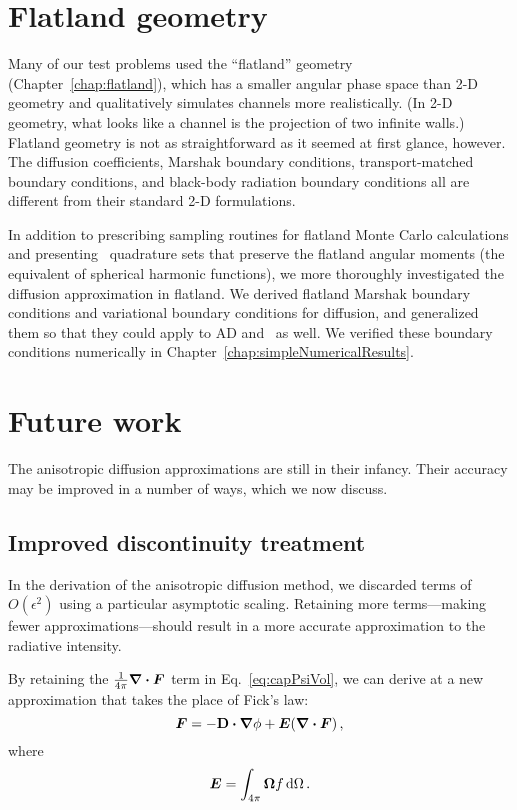 \section{Flatland geometry}

Many of our test problems used the ``flatland'' geometry
(Chapter~\ref{chap:flatland}), which has a smaller angular phase space than 2-D
geometry and qualitatively simulates channels more realistically. (In 2-D
geometry, what looks like a channel is the projection of two infinite walls.)
Flatland geometry is not as straightforward as it seemed at first glance,
however. The diffusion coefficients, Marshak boundary conditions,
transport-matched boundary conditions, and black-body radiation boundary
conditions all are different from their standard 2-D formulations.

In addition to prescribing sampling routines for flatland Monte Carlo
calculations and presenting \SN\ quadrature sets that preserve the flatland
angular moments (the equivalent of spherical harmonic functions), we more
thoroughly investigated the diffusion approximation in flatland. We derived
flatland Marshak boundary conditions and variational boundary conditions for
diffusion, and generalized them so that they could apply to AD and \APone\ as
well. We verified these boundary conditions numerically in
Chapter~\ref{chap:simpleNumericalResults}.

\section{Future work}

The anisotropic diffusion approximations are still in their infancy. Their
accuracy may be improved in a number of ways, which we now discuss.

\subsection{Improved discontinuity treatment}

In the derivation of the anisotropic diffusion method, we discarded
terms of $O(\epsilon^2)$ using a particular asymptotic scaling. Retaining more
terms---making fewer approximations---should result in a more accurate
approximation to the radiative intensity.

By retaining the $\frac{1}{4\pi} \bm{\nabla} \bm{\cdot} \bm{F}$ term in
Eq.~\eqref{eq:capPsiVol}, we can derive at a new approximation that takes the place
of Fick's law:
\begin{equation*}
  \bm{F} = - \mathbf{D} \bm{\cdot} \bm{\nabla} \phi + \bm{E} (\bm{\nabla} \bm{\cdot}\bm{F})\,,
\end{equation*}
where
\begin{equation*}
  \bm{E} = \int_{4\pi} \bm{\Omega} f \mathop{}\!\mathrm{d}\Omega\,.
\end{equation*}


